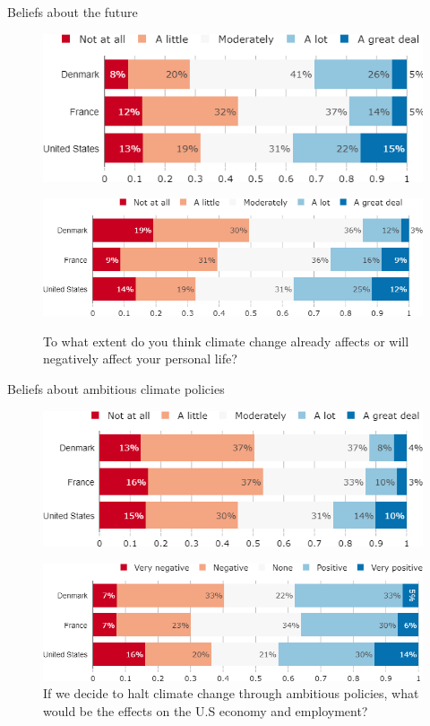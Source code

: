 \documentclass[aspectratio=169,9pt,dvipsnames]{beamer}
\begin{document}
\begin{frame}{Beliefs about the future}%
\begin{figure}[h!]
\caption{To what extent do you think that it is technically feasible to stop greenhouse gas emissions while maintaining satisfactory standards of living in France?}
\includegraphics[width=.6\textwidth]{../figures/country_comparison/net_zero_feasible_countries.png} \\
\caption{To what extent do you think climate change already affects or will negatively affect your personal life?}
\includegraphics[width=.6\textwidth]{../figures/country_comparison/CC_affects_self_countries.png} \\
\end{figure}
\end{frame}

\begin{frame}{Beliefs about ambitious climate policies}%
\begin{figure}[h!]
\centering
\caption{If we decide to halt climate change through ambitious policies, to what extent do you think it would negatively affect your lifestyle?}
\includegraphics[width=.59\textwidth]{../figures/country_comparison/effect_halt_CC_lifestyle_countries.png} \\
\caption{If we decide to halt climate change through ambitious policies, what would be the effects on the U.S economy and employment?}
\includegraphics[width=.59\textwidth]{../figures/country_comparison/effect_halt_CC_economy_countries.png}
\end{figure}
\end{frame}
\end{document}
